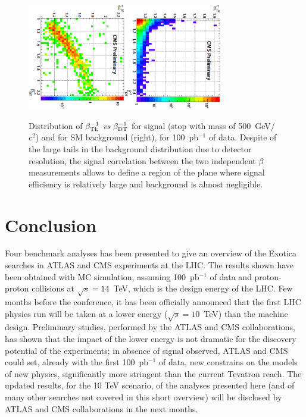 \documentclass{cimento}
\begin{document}
\begin{figure}[htbp] 
\centering
\includegraphics[angle=90,width=0.38\textwidth]{betaHSCPSig.eps}\includegraphics[angle=90,width=0.38\textwidth]{betaHSCPBkg.eps}  
\caption{Distribution of $\beta_{{\rm Tk}}^{-1}$ {\it vs} $\beta_{{\rm DT}}^{-1}$  
for signal (stop with mass of 500~GeV/$c^2$) and for SM background (right), 
for 100~pb$^{-1}$ of data. Despite of the large tails in the background distribution due 
to detector resolution, the signal correlation between the two independent 
$\beta$ measurements allows to define a region of the plane where signal efficiency is 
relatively large and background is almost negligible.}
\label{fig:HSCPSigBkgPlots}
\end{figure}

\section{Conclusion} \label{Conclusion}
Four benchmark analyses has been presented to give an
overview of the Exotica searches in ATLAS and CMS 
experiments at the LHC. The results shown have been obtained with 
MC simulation, assuming 100~pb$^{-1}$ of data and proton-proton collisions
at $\sqrt{s} = 14$~TeV, which is the design energy of the LHC.
Few months before the conference, it has been officially announced 
that the first LHC physics run will be taken at a lower energy 
($\sqrt{s} = 10$~TeV) than the machine design. Preliminary 
studies, performed by the ATLAS and CMS collaborations, 
has shown that the impact of the lower energy is not dramatic for the 
discovery potential of the experiments; in absence of signal observed,
ATLAS and CMS could set, already with the first 100~pb$^{-1}$ of data, 
new constrains on the models of new physics,  significantly more stringent 
than the current Tevatron reach. The updated results,
for the 10 TeV scenario, of the analyses presented here 
(and of many other searches not covered in this short overview) 
will be disclosed by ATLAS and CMS collaborations 
in the next months.
\end{document}
